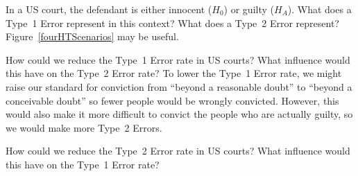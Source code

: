 \begin{exercisewrap}
\begin{nexercise} \label{whatAreTheErrorTypesInUSCourts}
In a US court, the defendant is either innocent ($H_0$) or
guilty ($H_A$).
What does a Type~1 Error represent in this context?
What does a Type~2 Error represent?
Figure~\ref{fourHTScenarios} may be useful.\footnotemark{}
\end{nexercise}
\end{exercisewrap}

\begin{examplewrap}
\begin{nexample}{How could we reduce the Type~1 Error rate
    in US courts?
    What influence would this have on the Type~2 Error rate?}
    \label{howToReduceType1ErrorsInUSCourts}%
  To lower the Type~1 Error rate, we might
  raise our standard for conviction from
  ``beyond a reasonable doubt'' to
  ``beyond a conceivable doubt'' so fewer people would
  be wrongly convicted. However, this would also make
  it more difficult to convict the people who are
  actually guilty, so we would make more Type~2 Errors.
\end{nexample}
\end{examplewrap}

\begin{exercisewrap}
\begin{nexercise} \label{howToReduceType2ErrorsInUSCourts}
How could we reduce the Type~2 Error rate in US courts?
What influence would this have on the Type~1 Error
rate?\footnotemark
\end{nexercise}
\end{exercisewrap}


